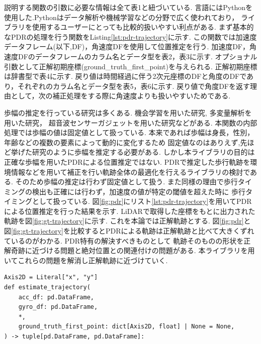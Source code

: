 説明する関数の引数に必要な情報は全て表1と紐づいている.
言語にはPythonを使用した.Pythonはデータ解析や機械学習などの分野で広く使われており，
ライブラリを使用するユーザーにとっても比較的扱いやすい利点がある.
まず基本的なPDRの処理を行う関数をListing\ref{lst:pdr-trajectory}に示す.
この関数では加速度データフレーム(以下,DF)，角速度DFを使用して位置推定を行う.
加速度DF，角速度DFのデータフレームのカラム名とデータ型を表2，表3に示す.
オプショナル引数として正解初期座標(ground\_truth\_first\_point)を与えられる.
正解初期座標は辞書型で表4に示す.
戻り値は時間経過に伴う2次元座標のDFと角度のDFであり，それぞれのカラム名とデータ型を表5，表6に示す.
戻り値で角度DFを返す理由として，次の補正処理をする際に角速度よりも扱いやすいためである.

歩幅の推定を行っている研究は多くある.
機会学習を用いた研究\cite{stride-length-auto-learning},
多変量解析を用いた研究\cite{stride-length-multi}，
超音波センサーガジェットを用いた研究\cite{stride-length-ultrasonic}などがある.
本関数の内部処理では歩幅の値は固定値として扱っている.
本来であれば歩幅は身長，性別，年齢などの複数の要素によって動的に変化するため
固定値なのはありえず,先ほど挙げた研究のように歩幅を推定する必要がある.
しかし本ライブラリの目的は正確な歩幅を用いたPDRによる位置推定ではない.
PDRで推定した歩行軌跡を環境情報などを用いて補正を行い軌跡全体の最適化を行えるライブラリの検討である.
そのため歩幅の推定は行わず固定値として扱う.
また同様の理由で歩行タイミングの検出も正確には行わず，加速度の値が特定の閾値を超えた時に
歩行タイミングとして扱っている.
図\ref{fig:pdr}にリスト\ref{lst:pdr-trajectory}を用いてPDRによる位置推定を行った結果を示す.
LiDARで取得した座標をもとに出力された軌跡を図\ref{fig:gt-trajectory}に示す.
これを本論では正解軌跡とする.
図\ref{fig:pdr}と図\ref*{fig:gt-trajectory}を比較するとPDRによる軌跡は正解軌跡と比べて大きくずれているのがわかる.
PDR特有の解決すべきものとして
軌跡そのものの形状を正解奇跡に近づける問題と絶対位置との関連付けの問題がある.
本ライブラリを用いてこれらの問題を解消し正解軌跡に近づけていく.

\begin{lstlisting}[caption={基本PDR}, label=lst:pdr-trajectory]
Axis2D = Literal["x", "y"]
def estimate_trajectory(
    acc_df: pd.DataFrame,
    gyro_df: pd.DataFrame,
    *,
    ground_truth_first_point: dict[Axis2D, float] | None = None,
) -> tuple[pd.DataFrame, pd.DataFrame]:
\end{lstlisting}

